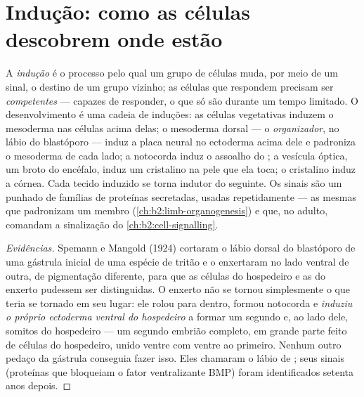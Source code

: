 \section{Indução: como as células descobrem onde estão}

\begin{definition}\label{def:b2:vertebrate-development:induction}
A \emph{indução} é o processo pelo qual um grupo de células muda, por
meio de um sinal, o destino de um grupo vizinho; as células que
respondem precisam ser \emph{competentes} --- capazes de responder, o
que só são durante um tempo limitado. O desenvolvimento é uma cadeia de
induções: as células vegetativas induzem o mesoderma nas células acima
delas; o mesoderma dorsal --- o \emph{organizador}, no lábio do
blastóporo --- induz a placa neural no ectoderma acima dele e
padroniza o mesoderma de cada lado; a notocorda induz o assoalho do
; a vesícula óptica, um broto do encéfalo, induz um
cristalino na pele que ela toca; o cristalino induz a córnea. Cada
tecido induzido se torna indutor do seguinte. Os sinais são um punhado
de famílias de proteínas secretadas, usadas repetidamente --- as mesmas
que padronizam um membro (\cref{ch:b2:limb-organogenesis}) e que, no adulto, comandam a
sinalização do \cref{ch:b2:cell-signalling}.
\end{definition}
\begin{proof}[Evidências]
Spemann e Mangold (1924) cortaram o lábio dorsal do blastóporo de uma
gástrula inicial de uma espécie de tritão e o enxertaram no lado
ventral de outra, de pigmentação diferente, para que as células do
hospedeiro e as do enxerto pudessem ser distinguidas. O enxerto não se
tornou simplesmente o que teria se tornado em seu lugar: ele rolou para
dentro, formou notocorda e \emph{induziu o próprio ectoderma ventral
do hospedeiro} a formar um segundo  e, ao lado dele,
somitos do hospedeiro --- um segundo embrião completo, em grande parte
feito de células do hospedeiro, unido ventre com ventre ao primeiro.
Nenhum outro pedaço da gástrula conseguia fazer isso. Eles chamaram o
lábio de ; seus sinais (proteínas que bloqueiam o fator
ventralizante BMP) foram identificados setenta anos depois.
\end{proof}

